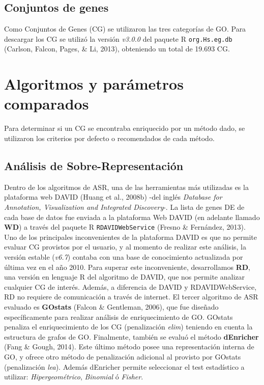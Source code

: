 \documentclass[12pt,twoside]{reedthesis}
\begin{document}
\hypertarget{conjuntos-de-genes}{%
\subsection{Conjuntos de genes}\label{conjuntos-de-genes}}

Como Conjuntos de Genes (CG) se utilizaron las tres categorías de GO. Para descargar los CG se utilizó la versión \emph{v3.0.0} del paquete R \texttt{org.Hs.eg.db} (Carlson, Falcon, Pages, \& Li, 2013), obteniendo un total de 19.693 CG.

\hypertarget{sec:algosComparados}{%
\section{Algoritmos y parámetros comparados}\label{sec:algosComparados}}

Para determinar si un CG se encontraba enriquecido por un método dado, se utilizaron los criterios por defecto o recomendados de cada método.

\hypertarget{analisis-de-sobre-representacion}{%
\subsection{Análisis de Sobre-Representación}\label{analisis-de-sobre-representacion}}

Dentro de los algoritmos de ASR, una de las herramientas más utilizadas es la plataforma web DAVID (Huang et al., 2008b) -del inglés \emph{Database for Annotation, Visualization and Integrated Discovery}-. La lista de genes DE de cada base de datos fue enviada a la plataforma Web DAVID (en adelante llamado \textbf{WD}) a través del paquete R \texttt{RDAVIDWebService} (Fresno \& Fernández, 2013). Uno de los principales inconvenientes de la plataforma DAVID es que no permite evaluar CG provistos por el usuario, y al momento de realizar este análisis, la versión estable (\emph{v6.7}) contaba con una base de conocimiento actualizada por última vez en el año 2010. Para superar este inconveniente, desarrollamos \textbf{RD}, una versión en lenguaje R del algoritmo de DAVID, que nos permite analizar cualquier CG de interés. Además, a diferencia de DAVID y RDAVIDWebService, RD no requiere de comunicación a través de internet. El tercer algoritmo de ASR evaluado es \textbf{GOstats} (Falcon \& Gentleman, 2006), que fue diseñado específicamente para realizar análisis de enriquecimiento de GO. GOstats penaliza el enriquecimiento de los CG (penalización \emph{elim}) teniendo en cuenta la estructura de grafos de GO. Finalmente, también se evaluó el método \textbf{dEnricher} (Fang \& Gough, 2014). Este último método posee una representación interna de GO, y ofrece otro método de penalización adicional al provisto por GOstats (penalización \emph{lea}). Además dEnricher permite seleccionar el test estadístico a utilizar: \emph{Hipergeométrico}, \emph{Binomial} ó \emph{Fisher}.
\end{document}
